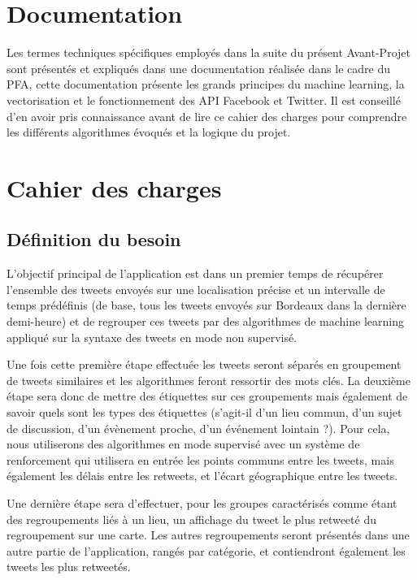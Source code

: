 \documentclass{article}
\begin{document}
\section{Documentation}

Les termes techniques spécifiques employés dans la suite du présent Avant-Projet sont présentés et expliqués dans une documentation réalisée dans le cadre du PFA, cette documentation présente les grands principes du machine learning, la vectorisation et le fonctionnement des API Facebook et Twitter. Il est conseillé d’en avoir pris connaissance avant de lire ce cahier des charges pour comprendre les différents algorithmes évoqués et la logique du projet.


\section{Cahier des charges}

\subsection{Définition du besoin}

L’objectif principal de l’application est dans un premier temps de récupérer l’ensemble des tweets envoyés sur une localisation précise et un intervalle de temps prédéfinis  (de base, tous les tweets envoyés sur Bordeaux dans la dernière demi-heure) et de regrouper ces tweets par des algorithmes de machine learning appliqué sur la syntaxe des tweets en mode non supervisé.

Une fois cette première étape effectuée les tweets seront séparés en groupement de tweets similaires et les algorithmes feront ressortir des mots clés. 
La deuxième étape sera donc  de mettre des étiquettes sur ces groupements mais également de savoir quels sont les types des étiquettes (s’agit-il d’un lieu commun, d’un sujet de discussion, d’un évènement proche, d’un événement lointain ?). 
Pour cela, nous utiliserons des algorithmes en mode supervisé avec un système de renforcement qui utilisera en entrée les points communs entre les tweets, mais également les délais entre les retweets, et l’écart géographique entre les tweets. 

Une dernière étape sera d’effectuer, pour les groupes caractérisés comme étant des regroupements liés à un lieu, un affichage du tweet le plus retweeté du regroupement sur une carte.
Les autres regroupements seront présentés dans une autre partie de l’application, rangés par catégorie, et contiendront également les tweets les plus retweetés.
\end{document}
